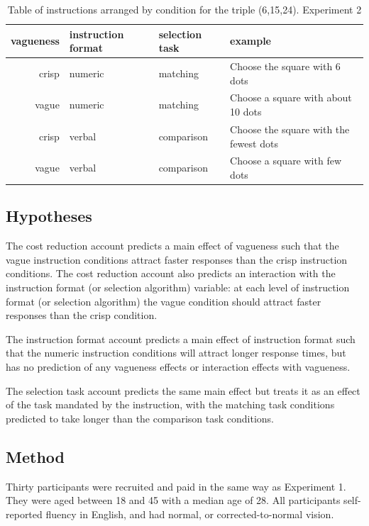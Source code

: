 \documentclass[
a4paper 
, doc
, longtable
]{apa6}
\begin{document}
\begin{table}[htbp]
\begin{center}
\caption{Table of instructions arranged by condition for the triple (6,15,24). Experiment 2}
\label{instructionse2}
\begin{tabular}{rlll}
\toprule
vagueness&instruction format&selection task&example\\
\midrule
crisp 	& 	numeric	& matching	&Choose the square with 6 dots \\
vague	&	numeric & matching	&Choose a square with about 10 dots\\
crisp	&	verbal	& comparison	&Choose the square with the fewest dots\\
vague	&	verbal	& comparison	&Choose a square with few dots\\
\bottomrule
\end{tabular}
\end{center}
\end{table}


\subsection{Hypotheses}
The cost reduction account predicts a main effect of vagueness such that the vague instruction conditions attract faster responses than the crisp instruction conditions. The cost reduction account also predicts an interaction with the instruction format (or selection algorithm) variable: at each level of instruction format (or selection algorithm) the vague condition should attract faster responses than the crisp condition.%

The instruction format account predicts a main effect of instruction format such that the numeric instruction conditions will attract longer response times, but has no prediction of any vagueness effects or interaction effects with vagueness.  

The selection task account predicts the same main effect but treats it as an effect of the task mandated by the instruction, with the matching task conditions predicted to take longer than the comparison task conditions.  


\subsection{Method}

Thirty participants were recruited and paid in the same way as Experiment 1. They were aged between 18 and 45 with a median age of 28. All participants self-reported fluency in English, and had normal, or corrected-to-normal vision.
\end{document}

